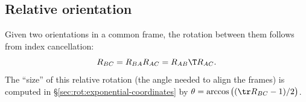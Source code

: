 \subsection{Relative orientation}\label{sec:rot:relative-orientation}
Given two orientations in a common frame, the rotation between them follows from index cancellation:
\[
R_{BC}=R_{BA}R_{AC}=R_{AB}\T R_{AC}.
\]
The ``size'' of this relative rotation (the angle needed to align the frames) is computed in \S\ref{sec:rot:exponential-coordinates} by $\theta=\arccos\big((\tr R_{BC}-1)/2\big)$.
